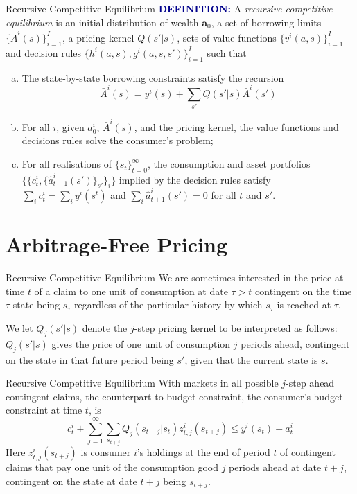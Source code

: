 \documentclass[aspectratio=169,xcolor=dvipsnames]{beamer}
\begin{document}
\begin{frame}{Recursive Competitive Equilibrium}
    \textcolor{darkblue}{\textbf{DEFINITION:}} A \emph{recursive competitive equilibrium} is an initial distribution of wealth $\mathbf{a}_0$, a set of borrowing limits $\{\bar A^i(s)\}_{i=1}^I$, a pricing kernel $Q(s' | s)$, sets of value functions $\{v^i(a, s)\}_{i=1}^I$ and decision rules $\{h^i(a, s), g^i(a, s, s')\}_{i=1}^I$ such that
    \begin{enumerate}[(a)]
        \item The state-by-state borrowing constraints satisfy the recursion
        \[
            \bar A^i(s) = y^i(s) + \sum_{s'} Q(s' | s) \bar A^i(s')
        \]
        \item For all $i$, given $a^i_0$, $\bar A^i(s)$, and the pricing kernel, the value functions and decisions rules solve the consumer's problem;
        \item For all realisations of $\{s_t\}_{t=0}^\infty$, the consumption and asset portfolios $\{\{c^i_t, \{\hat a^i_{t+1}(s')\}_{s'}\}_i\}$ implied by the decision rules satisfy $\sum_i c^i_t = \sum_i y^i(s^t)$ and $\sum_i \hat a^i_{t+1}(s') = 0$ for all $t$ and $s'$.
    \end{enumerate}
\end{frame}

\section{Arbitrage-Free Pricing}

\begin{frame}{Recursive Competitive Equilibrium}
    We are sometimes interested in the price at time $t$ of a claim to one unit of consumption at date $\tau > t$ contingent on the time $\tau$ state being $s_\tau$ regardless of the particular history by which $s_\tau$ is reached at $\tau$.

    We let $Q_j(s' | s)$ denote the $j$-step pricing kernel to be interpreted as follows: $Q_j(s' | s)$ gives the price of one unit of consumption $j$ periods ahead, contingent on the state in that future period being $s'$, given that the current state is $s$.
\end{frame}

\begin{frame}{Recursive Competitive Equilibrium}
    With markets in all possible $j$-step ahead contingent claims, the counterpart to budget constraint, the consumer's budget constraint at time $t$, is
    \[
        c^i_t + \sum_{j=1}^\infty \sum_{s_{t+j}} Q_j(s_{t+j} | s_t) z^i_{t,j}(s_{t+j}) \le y^i(s_t) + a^i_t
    \]
    Here $z^i_{t,j}(s_{t+j})$ is consumer $i$'s holdings at the end of period $t$ of contingent claims that pay one unit of the consumption good $j$ periods ahead at date $t+j$, contingent on the state at date $t+j$ being $s_{t+j}$.
\end{frame}
\end{document}
